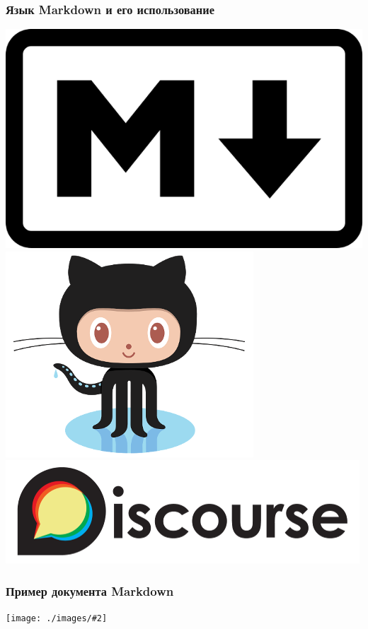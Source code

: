 \documentclass[12pt, compress, t]{beamer}
\newcommand{\screenshotw}[2]{
  \centering\texttt{[image: ./images/\#2]}
}
\begin{document}
\begin{frame}[fragile]
  \frametitle{Язык Markdown и его использование}
    \vspace{5em}
    \includegraphics[scale=1]{images/markdown.png}
    \includegraphics[scale=0.35]{images/octocat.png}
    \includegraphics[scale=0.35]{images/discourse.png}
\end{frame}

\begin{frame}[fragile]
  \frametitle{Пример документа Markdown}
  \vspace{0.5cm}
  \screenshotw{11cm}{md-html.png}
\end{frame}
\end{document}
